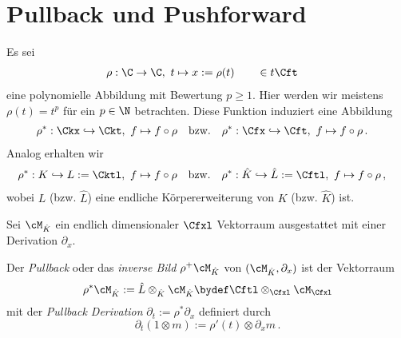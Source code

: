 \section{Pullback und Pushforward}
\begin{comment}
Nach \cite[1.a]{sabbah_Fourier-local} und \cite[1.3]{hotta2007d}.
\end{comment}
Es sei
\begin{align*}
\rho&:\C\rightarrow \C ,~ t\mapsto x:=\rho(t) \qquad\in t\Cft
\end{align*}
eine polynomielle Abbildung mit  Bewertung $p\geq1$.
Hier werden wir meistens $\rho(t)=t^p$ für ein $p\in \N$ betrachten. Diese
Funktion induziert eine Abbildung
\begin{align*}
\rho^*&:\Ckx\hookrightarrow \Ckt,~ f \mapsto f\circ \rho & \mbox{bzw.} &&
\rho^*&:\Cfx\hookrightarrow \Cft,~ f \mapsto f\circ \rho \,.
\end{align*}
Analog erhalten wir
\begin{align*}
\rho^*&:K\hookrightarrow L:=\Cktl,~ f \mapsto f\circ \rho & \mbox{bzw.} &&
\rho^*&:\hat K\hookrightarrow \hat L:=\Cftl,~ f \mapsto f\circ \rho \,,
\end{align*}
wobei $L$ (bzw. $\hat L$) eine endliche Körpererweiterung von $K$ (bzw. $\hat
K$) ist.
\begin{comment}
TODO: damit wird $\hat L$ zu einem $\hat K$ Vektorraum.
\end{comment}
\begin{comment}
TODO: $\nable$ zu $\partial_x$ ???? dann $\partial_t=\rho^*\partial_x$???
\end{comment}
Sei $\cM_{\hat K}$ ein endlich dimensionaler $\Cfxl$ Vektorraum ausgestattet
mit einer Derivation $\partial_x$.
%
\begin{defn}[Pullback] \label{defn:pull-back}
Der \emph{Pullback} oder das \emph{inverse Bild} $\rho^{+}\cM_{\hat K}$ von
$(\cM_{\hat K},\partial_x)$ ist der Vektorraum
\[
\rho^{*}\cM_{\hat K}:=\hat L\otimes_{\hat K}\cM_{\hat K}
\bydef\Cftl\otimes_{\Cfxl}\cM_{\Cfxl}
\]
mit der \emph{Pullback Derivation} $\partial_t:=\rho^*\partial_x$ definiert
durch
\begin{equation} \label{eq:pull-back-zusammenhang}
\partial_t(1\otimes m):=\rho'(t)\otimes\partial_xm \,.
\end{equation}
\begin{comment}
\cite[1.a]{sabbah_Fourier-local} und \cite[Page 34]{sabbah_cimpa90}
\end{comment}
\end{defn}
